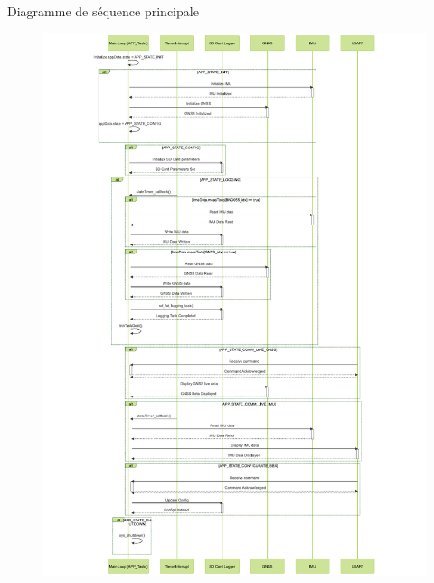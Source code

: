 \documentclass{beamer}
\begin{document}
\begin{frame}{Diagramme de séquence principale}
	\begin{figure}[!h]
		\centering
		\includegraphics[height=.9\textheight]{../figures/code/diagrammes/sequence-app}
		\label{fig:sequence-app}
	\end{figure}
\end{frame}
\end{document}
